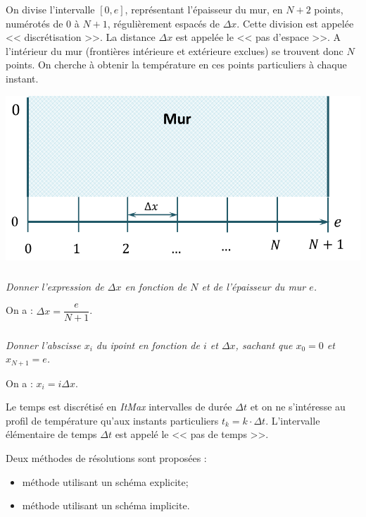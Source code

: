 \documentclass[10pt,fleqn]{article} %
\begin{document}
\noindent \begin{minipage}[c]{.6\linewidth}
On divise l'intervalle $[0,e]$, représentant l'épaisseur du mur, en $N+2$ points, numérotés de 0 à $N+1$, régulièrement espacés de $\Delta x$. Cette division est appelée << discrétisation >>. La distance $\Delta x$ est appelée le << pas d’espace >>. A l'intérieur du mur (frontières intérieure et extérieure exclues) se trouvent donc $N$ points. On cherche à obtenir la température en ces points particuliers à chaque instant. 


\end{minipage} \hfill
\begin{minipage}[c]{.38\linewidth}
\begin{center}
\includegraphics[width=\linewidth]{images/figure_02}
\end{center}
\end{minipage}
\fi

\subparagraph{\label{q_xini}}\textit{Donner l'expression de $\Delta x$ en fonction de $N$ et de l'épaisseur du mur $e$.}
\ifprof
\begin{corrige}
On a : $\Delta x = \dfrac{e}{N+1}$.
\end{corrige}
\else
\fi


\subparagraph{\label{q_xini2}}\textit{Donner l'abscisse $x_i$ du i\ieme point 
en fonction de $i$ et $\Delta x$, sachant que $x_0=0$ et  $x_{N+1} = e$.}
\ifprof
\begin{corrige}
On a : $x_i = i \Delta x$.
\end{corrige}
\else
\fi
\ifprof
\else
\vspace{.5cm}

Le temps est discrétisé en \textit{ItMax} intervalles de durée $\Delta t$ et on ne s'intéresse 
au profil de température qu'aux instants particuliers $t_k = k \cdot \Delta t$. 
L'intervalle élémentaire de temps $\Delta t$ est appelé le << pas de temps >>.

\noindent
Deux méthodes de résolutions sont proposées : 
\begin{itemize}
\item méthode utilisant un schéma explicite;
\item méthode utilisant un schéma implicite.
\end{itemize}
\fi
\end{document}
